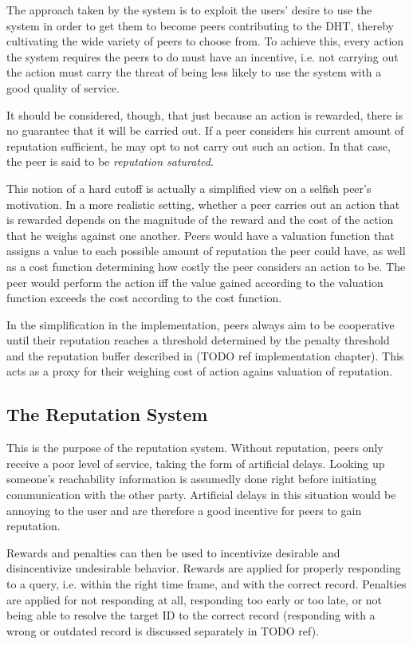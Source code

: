The approach taken by the system is to exploit the users' desire to use the
system in order to get them to become peers contributing to the \ac{DHT},
thereby cultivating the wide variety of peers to choose from. To achieve this,
every action the system requires the peers to do must have an incentive, i.e.
not carrying out the action must carry the threat of being less likely to use
the system with a good quality of service.

It should be considered, though, that just because an action is rewarded, there
is no guarantee that it will be carried out. If a peer considers his current
amount of reputation sufficient, he may opt to not carry out such an action. In
that case, the peer is said to be \emph{reputation saturated}.

This notion of a hard cutoff is actually a simplified view on a selfish peer's
motivation. In a more realistic setting, whether a peer carries out an action
that is rewarded depends on the magnitude of the reward and the cost of the
action that he weighs against one another. Peers would have a valuation function
that assigns a value to each possible amount of reputation the peer could have,
as well as a cost function determining how costly the peer considers an action
to be. The peer would perform the action iff the value gained according to the
valuation function exceeds the cost according to the cost function.

In the simplification in the implementation, peers always aim to be cooperative
until their reputation reaches a threshold determined by the penalty threshold
and the reputation buffer described in (TODO ref implementation chapter). This
acts as a proxy for their weighing cost of action agains valuation of
reputation.

\subsection{The Reputation System}
\label{sec:desc_rep_system}
This is the purpose of the reputation system. Without reputation, peers only
receive a poor level of service, taking the form of artificial delays. Looking
up someone's reachability information is assumedly done right before initiating
communication with the other party. Artificial delays in this situation would be
annoying to the user and are therefore a good incentive for peers to gain
reputation.

Rewards and penalties can then be used to incentivize desirable and
disincentivize undesirable behavior. Rewards are applied for properly responding
to a query, i.e. within the right time frame, and with the correct record.
Penalties are applied for not responding at all, responding too early or too
late, or not being able to resolve the target ID to the correct record
(responding with a wrong or outdated record is discussed separately in TODO
ref).

